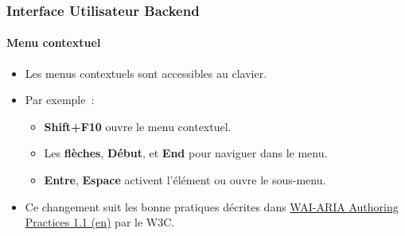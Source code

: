 %

\begin{frame}[fragile]
	\frametitle{Interface Utilisateur Backend}
	\framesubtitle{Menu contextuel}

	\begin{itemize}
		\item Les menus contextuels sont accessibles au clavier.
		\item Par exemple~:

			\begin{itemize}\small
				\item \textbf{Shift+F10} ouvre le menu contextuel.
				\item Les \textbf{flèches}, \textbf{Début}, et \textbf{End} pour naviguer dans le menu.
				\item \textbf{Entre}, \textbf{Espace} activent l'élément ou ouvre le sous-menu.
			\end{itemize}

		\item Ce changement suit les bonne pratiques décrites dans
			\href{https://www.w3.org/TR/wai-aria-practices-1.1/#keyboard-interaction-12}{WAI-ARIA Authoring Practices 1.1 (en)}
			par le W3C.

	\end{itemize}

\end{frame}


